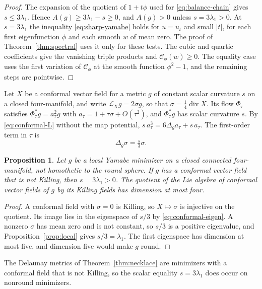 \documentclass[11pt]{article}
\numberwithin{equation}{section}
\newtheorem{proposition}[theorem]{Proposition}
\newcommand{\abs}[1]{\lvert #1\rvert}
\begin{document}
\begin{proof}
The expansion of the quotient of \(1+t\phi\) used for
\eqref{eq:balance-chain} gives \(s\le3\lambda_1\). Hence
\(A(g)\ge3\lambda_1-s\ge0\), and \(A(g)>0\) unless \(s=3\lambda_1>0\).
At \(s=3\lambda_1\) the inequality \eqref{eq:sharp-yamabe} holds for
\(u=u_t\) and small \(\abs t\), for each first eigenfunction \(\phi\)
and each smooth \(w\) of mean zero. The proof of
Theorem~\ref{thm:spectral} uses it only for these tests. The cubic
and quartic coefficients give the vanishing triple products and
\(\mathcal C_\phi(w)\ge0\). The equality case uses the first variation
of \(\mathcal C_\phi\) at the smooth function \(\phi^2-1\), and the
remaining steps are pointwise.
\end{proof}

Let \(X\) be a conformal vector field for a metric \(g\) of constant
scalar curvature \(s\) on a closed four-manifold, and write
\(\mathcal L_Xg=2\sigma g\), so that
\(\sigma=\tfrac14\operatorname{div}X\). Its flow \(\Phi_\tau\) satisfies
\(\Phi_\tau^*g=a_\tau^2g\) with \(a_\tau=1+\tau\sigma+O(\tau^2)\), and
\(\Phi_\tau^*g\) has scalar curvature \(s\). By
\eqref{eq:conformal-L} without the map potential,
\(s\,a_\tau^3=6\Delta_ga_\tau+s\,a_\tau\). The first-order term in
\(\tau\) is
\begin{equation}\label{eq:conformal-eigen}
 \Delta_g\sigma=\tfrac{s}{3}\sigma .
\end{equation}

\begin{proposition}\label{prop:broken}
Let \(g\) be a local Yamabe minimizer on a closed connected
four-manifold, not homothetic to the round sphere. If \(g\) has a
conformal vector field that is not Killing, then \(s=3\lambda_1>0\).
The quotient of the Lie algebra of conformal vector fields of \(g\) by
its Killing fields has dimension at most four.
\end{proposition}

\begin{proof}
A conformal field with \(\sigma=0\) is Killing, so \(X\mapsto\sigma\)
is injective on the quotient. Its image lies in the eigenspace of
\(s/3\) by \eqref{eq:conformal-eigen}. A nonzero \(\sigma\) has mean
zero and is not constant, so \(s/3\) is a positive eigenvalue, and
Proposition~\ref{prop:local} gives \(s/3=\lambda_1\). The first
eigenspace has dimension at most five, and dimension five would make
\(g\) round.
\end{proof}

The Delaunay metrics of Theorem~\ref{thm:necklace} are minimizers with
a conformal field that is not Killing, so the scalar equality
\(s=3\lambda_1\) does occur on nonround minimizers.
\end{document}
